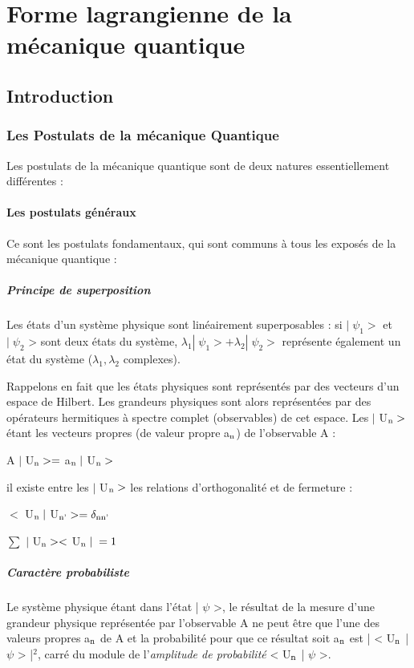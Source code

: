 \part{Forme lagrangienne de la mécanique quantique}%

 \chapter{Introduction}
\section{Les Postulats de la mécanique Quantique}

Les postulats de la mécanique quantique sont de deux
natures essentiellement différentes :
\subsection{Les postulats généraux}
Ce sont les postulats fondamentaux, qui
sont communs à tous les exposés de la mécanique quantique :

\subsubsection{Principe de superposition}
Les états d'un système
physique sont linéairement superposables : si  $|\;\psi_1>$ et $|\;\psi_2$ > sont
deux états du système, $\lambda_1|\;\psi_1>+\lambda_2|\;\psi_2>$
représente également un état du système ($\lambda_1, \lambda_2$ complexes).

Rappelons en fait que les états physiques sont représentés
par des vecteurs d'un espace de Hilbert. Les grandeurs physiques sont
alors représentées par des opérateurs hermitiques à spectre complet
(observables) de cet espace. Les $|$ U$_{\text{n}}>$ étant les vecteurs propres
(de valeur propre a$_{\text{n}}$) de l'observable A :
\begin{center}
A $|$ U$_{\text{n}}>=$ a$_{\text{n}}\;|$ U$_{\text{n}}>$
\end{center}
il existe entre les $|$ U$_{\text{n}}>$ les relations d'orthogonalité et de
fermeture :
\begin{center}
$<$ U$_{\text{n}}\;|$ U$_{\text{n'}}>=\delta_{\text{nn'}}$

$\sum$ $|$ U$_{\text{n}}><$ U$_{\text{n}}\;|\;=1$
\end{center}

\subsubsection{Caractère probabiliste}
Le système physique étant dans
l'état | $\psi$ >, le résultat de la mesure d'une grandeur physique représentée
par l'observable A ne peut être que l'une des valeurs propres
a$_{\text{n}}$ de A et la probabilité pour que ce résultat soit a$_{\text{n}}$ est
| < U$_{\text{n}}$ | $\psi$ > |$^2$, carré du module de l'{\it amplitude de probabilité}
< U$_{\text{n}}$ | $\psi$ >.
